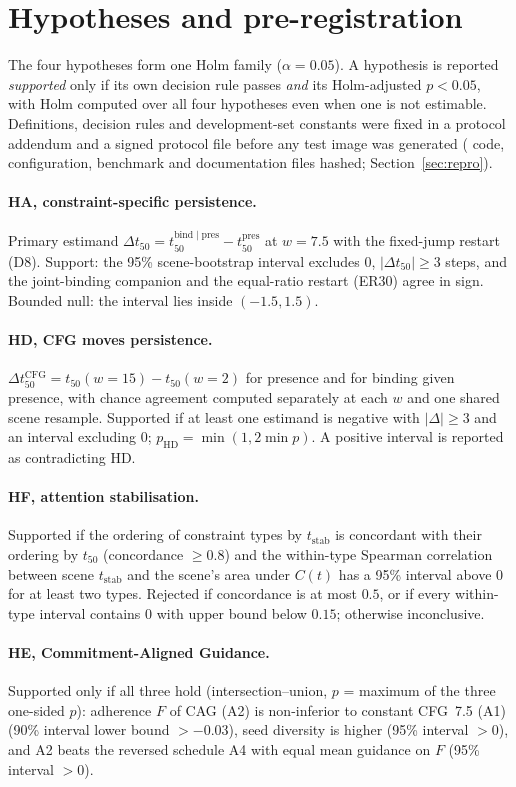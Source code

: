 \section{Hypotheses and pre-registration}\label{sec:rq}
The four hypotheses form one Holm family ($\alpha=0.05$). A hypothesis is reported \emph{supported} only if its own decision rule passes \emph{and} its Holm-adjusted $p<0.05$, with Holm computed over all four hypotheses even when one is not estimable. Definitions, decision rules and development-set constants were fixed in a protocol addendum and a signed protocol file before any test image was generated (\frozenFiles{} code, configuration, benchmark and documentation files hashed; Section~\ref{sec:repro}).

\paragraph{HA, constraint-specific persistence.} Primary estimand $\Delta t_{50}=t_{50}^{\mathrm{bind\mid pres}}-t_{50}^{\mathrm{pres}}$ at $w=7.5$ with the fixed-jump restart (D8). Support: the 95\% scene-bootstrap interval excludes $0$, $|\Delta t_{50}|\ge3$ steps, and the joint-binding companion and the equal-ratio restart (ER30) agree in sign. Bounded null: the interval lies inside $(-1.5,1.5)$.
\paragraph{HD, CFG moves persistence.} $\Delta t_{50}^{\mathrm{CFG}}=t_{50}(w{=}15)-t_{50}(w{=}2)$ for presence and for binding given presence, with chance agreement computed separately at each $w$ and one shared scene resample. Supported if at least one estimand is negative with $|\Delta|\ge3$ and an interval excluding $0$; $p_{\mathrm{HD}}=\min(1,2\min p)$. A positive interval is reported as contradicting HD.
\paragraph{HF, attention stabilisation.} Supported if the ordering of constraint types by $t_{\mathrm{stab}}$ is concordant with their ordering by $t_{50}$ (concordance $\ge0.8$) and the within-type Spearman correlation between scene $t_{\mathrm{stab}}$ and the scene's area under $C(t)$ has a 95\% interval above $0$ for at least two types. Rejected if concordance is at most $0.5$, or if every within-type interval contains $0$ with upper bound below $0.15$; otherwise inconclusive.
\paragraph{HE, Commitment-Aligned Guidance.} Supported only if all three hold (intersection--union, $p$ = maximum of the three one-sided $p$): adherence $F$ of CAG (A2) is non-inferior to constant CFG~7.5 (A1) (90\% interval lower bound $>-0.03$), seed diversity is higher (95\% interval $>0$), and A2 beats the reversed schedule A4 with equal mean guidance on $F$ (95\% interval $>0$).

